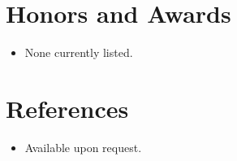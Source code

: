 \documentclass[11pt,a4paper,sans]{moderncv}
\begin{document}

\section{Honors and Awards}
\vspace{1pt}
\begin{itemize}
\item{None currently listed.}
\end{itemize}


\section{References}
\vspace{1pt}
\begin{itemize}
\item{Available upon request.}
\end{itemize}
\end{document}
